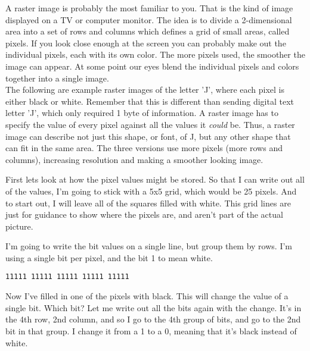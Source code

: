 A raster image is probably the most familiar to you. That is the kind of image displayed on a TV or computer monitor. The idea is to divide a 2-dimensional area into a set of rows and columns which defines a grid of small areas, called pixels. If you look close enough at the screen you can probably make out the individual pixels, each with its own color. The more pixels used, the smoother the image can appear. At some point our eyes blend the individual pixels and colors together into a single image.\\

The following are example raster images of the letter 'J', where each pixel is either black or white. Remember that this is different than sending digital text letter 'J', which only required 1 byte of information. A raster image has to specify the value of every pixel against all the values it \textit{could} be. Thus, a raster image can describe not just this shape, or font, of J, but any other shape that can fit in the same area. The three versions use more pixels (more rows and columns), increasing resolution and making a smoother looking image.\\

\begin{center}\end{center}

First lets look at how the pixel values might be stored. So that I can write out all of the values, I'm going to stick with a 5x5 grid, which would be 25 pixels. And to start out, I will leave all of the squares filled with white. This grid lines are just for guidance to show where the pixels are, and aren't part of the actual picture.\\


\begin{center}\end{center}

I'm going to write the bit values on a single line, but group them by rows. I'm using a single bit per pixel, and the bit 1 to mean white.\\

\begin{verbatim}
11111 11111 11111 11111 11111
\end{verbatim}

Now I've filled in one of the pixels with black. This will change the value of a single bit. Which bit? Let me write out all the bits again with the change. It's in the 4th row, 2nd column, and so I go to the 4th group of bits, and go to the 2nd bit in that group. I change it from a 1 to a 0, meaning that it's black instead of white.\\

